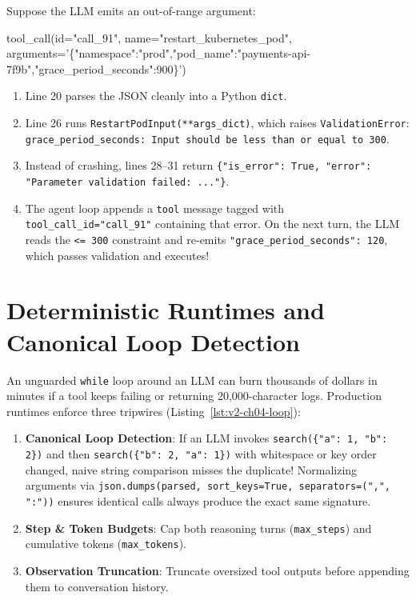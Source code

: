 \begin{intuitionbox}
Suppose the LLM emits an out-of-range argument:
\begin{center}\small\ttfamily
tool\_call(id="call\_91", name="restart\_kubernetes\_pod", arguments='\{"namespace":"prod","pod\_name":"payments-api-7f9b","grace\_period\_seconds":900\}')
\end{center}
\begin{enumerate}
  \item Line 20 parses the JSON cleanly into a Python \texttt{dict}.
  \item Line 26 runs \texttt{RestartPodInput(**args\_dict)}, which raises \texttt{ValidationError}: \texttt{grace\_period\_seconds: Input should be less than or equal to 300}.
  \item Instead of crashing, lines 28--31 return \texttt{\{"is\_error": True, "error": "Parameter validation failed: ..."\}}.
  \item The agent loop appends a \texttt{tool} message tagged with \texttt{tool\_call\_id="call\_91"} containing that error. On the next turn, the LLM reads the \texttt{<= 300} constraint and re-emits \texttt{"grace\_period\_seconds": 120}, which passes validation and executes!
\end{enumerate}
\end{intuitionbox}

\section{Deterministic Runtimes and Canonical Loop Detection}

An unguarded \texttt{while} loop around an LLM can burn thousands of dollars in minutes if a tool keeps failing or returning 20,000-character logs. Production runtimes enforce three tripwires (Listing~\ref{lst:v2-ch04-loop}):
\begin{enumerate}[leftmargin=18pt]
  \item \textbf{Canonical Loop Detection}: If an LLM invokes \texttt{search(\{"a": 1, "b": 2\})} and then \texttt{search(\{"b": 2, "a": 1\})} with whitespace or key order changed, naive string comparison misses the duplicate! Normalizing arguments via \texttt{json.dumps(parsed, sort\_keys=True, separators=(",", ":"))} ensures identical calls always produce the exact same signature.
  \item \textbf{Step \& Token Budgets}: Cap both reasoning turns (\texttt{max\_steps}) and cumulative tokens (\texttt{max\_tokens}).
  \item \textbf{Observation Truncation}: Truncate oversized tool outputs before appending them to conversation history.
\end{enumerate}

